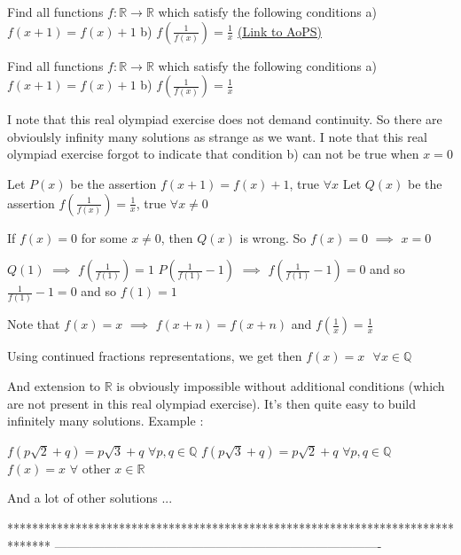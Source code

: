 \begin{problem}
	Find all functions  $f: \mathbb R\to\mathbb R$ which satisfy the following conditions
a) $f(x+1)=f(x)+1$
b) $f\left(\frac{1}{f(x)}\right)=\frac{1}{x}$
	\flushright \href{https://artofproblemsolving.com/community/c6h567600}{(Link to AoPS)}
\end{problem}



\begin{solution}
	\begin{tcolorbox}Find all functions  $f: \mathbb R\to\mathbb R$ which satisfy the following conditions
a) $f(x+1)=f(x)+1$
b) $f\left(\frac{1}{f(x)}\right)=\frac{1}{x}$\end{tcolorbox}
I note that this real olympiad exercise does not demand continuity. So there are obvioulsly infinity many solutions as strange as we want.
I note that this real olympiad exercise forgot to indicate that condition b) can not be true when $x=0$

Let $P(x)$ be the assertion $f(x+1)=f(x)+1$, true $\forall x$
Let $Q(x)$ be the assertion $f(\frac 1{f(x)})=\frac 1x$, true $\forall x\ne 0$

If $f(x)=0$ for some $x\ne 0$, then $Q(x)$ is wrong. So $f(x)=0$ $\implies$ $x=0$

$Q(1)$ $\implies$ $f(\frac 1{f(1)})=1$
$P(\frac 1{f(1)}-1)$ $\implies$ $f(\frac 1{f(1)}-1)=0$ and so $\frac 1{f(1)}-1=0$ and so $f(1)=1$

Note that $f(x)=x$ $\implies$ $f(x+n)=f(x+n)$ and $f(\frac 1x)=\frac 1x$

Using continued fractions representations, we get then $\boxed{f(x)=x\text{   }\forall x\in\mathbb Q}$

And extension to $\mathbb R$ is obviously impossible without additional conditions (which are not present in this real olympiad exercise).
It's then quite easy to build infinitely many solutions.
Example :

$f(p\sqrt 2+q)=p\sqrt 3+q$ $\forall p,q\in\mathbb Q$
$f(p\sqrt 3+q)=p\sqrt 2+q$ $\forall p,q\in\mathbb Q$
$f(x)=x$ $\forall$ other $x\in\mathbb R$

And a lot of other solutions ...
\end{solution}
*******************************************************************************
-------------------------------------------------------------------------------

